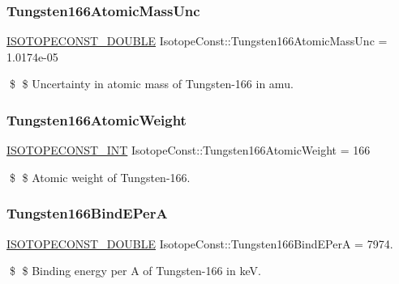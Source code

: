 \subsubsection{\texorpdfstring{Tungsten166\+Atomic\+Mass\+Unc}{Tungsten166AtomicMassUnc}}
{\footnotesize\ttfamily \mbox{\hyperlink{group___isotope_const-_macros_ga8f45a7272ce02c0b4c65c44636ed719a}{I\+S\+O\+T\+O\+P\+E\+C\+O\+N\+S\+T\+\_\+\+D\+O\+U\+B\+LE}} Isotope\+Const\+::\+Tungsten166\+Atomic\+Mass\+Unc = 1.\+0174e-\/05}

\$ \$ Uncertainty in atomic mass of Tungsten-\/166 in amu. \mbox{\label{group___isotope_const-_tungsten-_w166_ga751fb3b75d7505fdf93e96019deaf683}} 
\subsubsection{\texorpdfstring{Tungsten166\+Atomic\+Weight}{Tungsten166AtomicWeight}}
{\footnotesize\ttfamily \mbox{\hyperlink{group___isotope_const-_macros_ga5f18360b3e99483a35c32d789e62621c}{I\+S\+O\+T\+O\+P\+E\+C\+O\+N\+S\+T\+\_\+\+I\+NT}} Isotope\+Const\+::\+Tungsten166\+Atomic\+Weight = 166}

\$ \$ Atomic weight of Tungsten-\/166. \mbox{\label{group___isotope_const-_tungsten-_w166_gacf41edcf051b66c19b73393d08265ba5}} 
\subsubsection{\texorpdfstring{Tungsten166\+Bind\+E\+PerA}{Tungsten166BindEPerA}}
{\footnotesize\ttfamily \mbox{\hyperlink{group___isotope_const-_macros_ga8f45a7272ce02c0b4c65c44636ed719a}{I\+S\+O\+T\+O\+P\+E\+C\+O\+N\+S\+T\+\_\+\+D\+O\+U\+B\+LE}} Isotope\+Const\+::\+Tungsten166\+Bind\+E\+PerA = 7974.}

\$ \$ Binding energy per A of Tungsten-\/166 in keV. \mbox{\label{group___isotope_const-_tungsten-_w166_ga981bd586bfbe63924599170b11670fd0}} 
